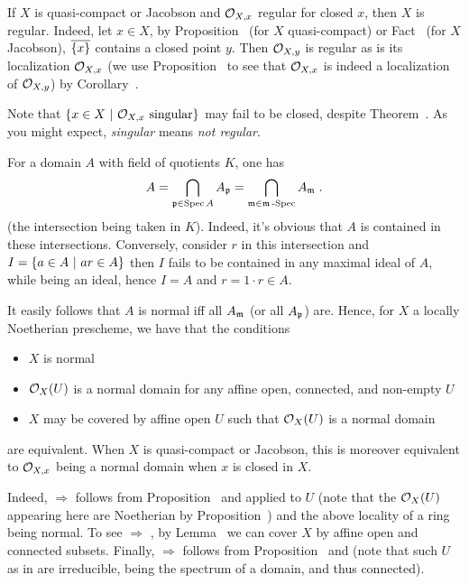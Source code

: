 \documentclass[a4paper,parskip=half,numbers=enddot, DIV=12]{scrreprt}
\begin{document}
\begin{rem}
    \begin{alphanumerate}
    \item 
        If $X$ is quasi-compact or Jacobson and $\mathcal{O}_{X,x}$ regular for closed $x$, then $X$ is regular. Indeed, let $x\in X$, by Proposition~ (for $X$ quasi-compact) or Fact~ (for $X$ Jacobson), $\overline{\{x\}}$ contains a closed point $y$. Then $\mathcal{O}_{X,y}$ is regular as is its localization $\mathcal{O}_{X,x}$ (we  use Proposition~ to see that $\mathcal{O}_{X,x}$ is indeed a localization of $\mathcal{O}_{X,y}$) by Corollary~.
    \item   
        Note that $\left\{x\in X\ \middle|\  \mathcal{O}_{X,x} \text{ singular}\right\}$ may fail to be closed, despite Theorem~. As you might expect, \emph{singular} means \emph{not regular}.
    \item 
        For a domain $A$ with field of quotients $K$, one has 
        \begin{align*}
        	A=\bigcap_{\mathfrak{p}\in \operatorname{Spec} A}  A_{\mathfrak{p}} = \bigcap_{\mathfrak{m}\in\mathfrak{m}\operatorname{-Spec}} A_{\mathfrak{m}}\;.
        \end{align*}
        (the intersection being taken in $K$). Indeed, it's obvious that $A$ is contained in these intersections. Conversely, consider $r$ in this intersection and $I=\left\{a\in A\ \middle|\  ar\in A\right\}$ then $I$ fails to be contained in any maximal ideal of $A$, while being an ideal, hence $I=A$ and $r=1\cdot r\in A$. 
        
        It easily follows that $A$ is normal iff all $A_{\mathfrak{m}}$ (or all $A_{\mathfrak{p}}$) are. Hence, for $X$ a locally Noetherian prescheme, we have that the conditions
        \begin{itemize}
        	\item[\itememph{\alpha}] $X$ is normal
        	\item[\itememph{\beta}] $\mathcal{O}_X(U)$ is a normal domain for any affine open, connected, and non-empty $U$
        	\item[\itememph{\gamma}] $X$ may be covered by affine open $U$ such that $\mathcal{O}_X(U)$ is a normal domain
        \end{itemize}
         are equivalent. When $X$ is quasi-compact or Jacobson, this is moreover equivalent to $\mathcal{O}_{X,x}$ being a normal domain when $x$ is closed in $X$.
         
         Indeed, \itememph{\alpha} $\Rightarrow$ \itememph{\beta} follows from Proposition~ and  applied to $U$ (note that the $\mathcal{O}_X(U)$ appearing here are Noetherian by Proposition~) and the above locality of a ring being normal. To see \itememph{\beta} $\Rightarrow$ \itememph{\gamma}, by Lemma~ we can cover $X$ by affine open and connected subsets. Finally, \itememph{\gamma} $\Rightarrow$ \itememph{\alpha} follows from Proposition~ and  (note that such $U$ as in \itememph{\gamma} are irreducible, being the spectrum of a domain, and thus connected).
         

\end{alphanumerate}
\end{rem}
\end{document}
